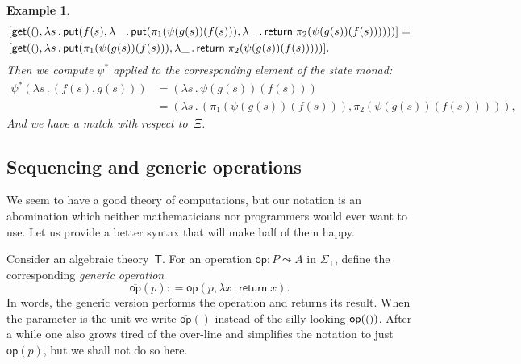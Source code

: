 \documentclass{amsart}
\newcommand{\theory}[1]{\mathsf{#1}} %
\newcommand{\signature}[1]{\Sigma_{\theory{#1}}} %
\newcommand{\lam}[1]{\lambda #1 \,.\,}
\newcommand{\opdecl}[3]{#1 : #2 \leadsto #3} %
\newcommand{\unit}{{\text{\small$()$}}} %
\newcommand{\defeq}{\mathbin{{:}{=}}} %
\newcommand{\kode}[1]{\mathsf{#1}}
\newcommand{\xopgen}[2]{\overline{#1}(#2)}
\newcommand{\opgen}[2]{\xopgen{\kode{#1}}{#2}}
\newcommand{\opcall}[3]{\kode{#1}(#2, #3)}
\newcommand{\return}[1]{\kode{return}\;#1}
\newtheorem{example}{Example}[section]
\begin{document}
\begin{example}
\begin{align*}
    &[\opcall{get}{\unit}{\lam{s} \opcall{put}{f(s)}{\lam{\_}
      \opcall{put}{\pi_1 (\psi(g(s))(f(s)))}{\lam{\_} \return{\pi_2 (\psi(g(s))(f(s)))}}
    }}] = \\
    &[\opcall{get}{\unit}{\lam{s}
      \opcall{put}{\pi_1 (\psi(g(s))(f(s)))}{\lam{\_} \return{\pi_2 (\psi(g(s))(f(s)))}}
    }].
  \end{align*}
  Then we compute $\psi^{*}$ applied to the corresponding element of the state monad:
  \begin{align*}
    \psi^{*}(\lam{s} (f(s), g(s)))
    &= (\lam{s} \psi(g(s))(f(s))) \\
    &= (\lam{s} (\pi_1 (\psi(g(s))(f(s))), \pi_2 (\psi(g(s))(f(s))))),
  \end{align*}
  And we have a match with respect to~$\Xi$.
\end{example}


\subsection{Sequencing and generic operations}
\label{sec:sequ-gener-oper}

We seem to have a good theory of computations, but our notation is an
abomination which neither mathematicians nor programmers would ever want to use.
Let us provide a better syntax that will make half of them happy.

Consider an algebraic theory~$\theory{T}$. For an operation $\opdecl{\kode{op}}{P}{A}$
in $\signature{T}$, define the corresponding \emph{generic operation}
%
\begin{equation*}
  \opgen{op}{p} \defeq \opcall{op}{p}{\lam{x} \return{x}}.
\end{equation*}
%
In words, the generic version performs the operation and returns its result.
When the parameter is the unit we write $\opgen{op}{}$ instead of the silly
looking $\opgen{op}{\unit}$. After a while one also grows tired of the over-line
and simplifies the notation to just $\kode{op}(p)$, but we shall not do so here.
\end{document}
